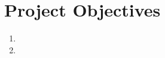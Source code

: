 \section{Project Objectives}
\smallskip

\begin{enumerate}
    \itemsep1em
    \item \blindtext[1]
    \item \blindtext[1]
\end{enumerate}
